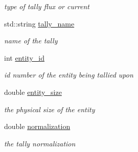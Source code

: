 \begin{DoxyCompactItemize}
\begin{DoxyCompactList}\small\item\em type of tally flux or current \end{DoxyCompactList}\item 
\hypertarget{classpyne_1_1_tally_af5e75c809e337a06d26636020d3f1809}{std\-::string \hyperlink{classpyne_1_1_tally_af5e75c809e337a06d26636020d3f1809}{tally\-\_\-name}}\label{classpyne_1_1_tally_af5e75c809e337a06d26636020d3f1809}

\begin{DoxyCompactList}\small\item\em name of the tally \end{DoxyCompactList}\item 
\hypertarget{classpyne_1_1_tally_a84aa789b361f4323e2906a411ef3a791}{int \hyperlink{classpyne_1_1_tally_a84aa789b361f4323e2906a411ef3a791}{entity\-\_\-id}}\label{classpyne_1_1_tally_a84aa789b361f4323e2906a411ef3a791}

\begin{DoxyCompactList}\small\item\em id number of the entity being tallied upon \end{DoxyCompactList}\item 
\hypertarget{classpyne_1_1_tally_a1a19c1b79ed25ea2a3d08b15b30bbea1}{double \hyperlink{classpyne_1_1_tally_a1a19c1b79ed25ea2a3d08b15b30bbea1}{entity\-\_\-size}}\label{classpyne_1_1_tally_a1a19c1b79ed25ea2a3d08b15b30bbea1}

\begin{DoxyCompactList}\small\item\em the physical size of the entity \end{DoxyCompactList}\item 
\hypertarget{classpyne_1_1_tally_a8ff1eb44926ad1e415386983679c78f1}{double \hyperlink{classpyne_1_1_tally_a8ff1eb44926ad1e415386983679c78f1}{normalization}}\label{classpyne_1_1_tally_a8ff1eb44926ad1e415386983679c78f1}

\begin{DoxyCompactList}\small\item\em the tally normalization \end{DoxyCompactList}\end{DoxyCompactItemize}



